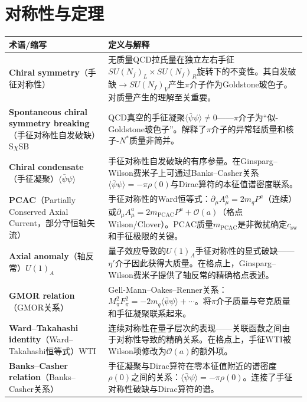 \documentclass[12pt,a4paper]{ctexart}
\begin{document}
\section{对称性与定理}

\begin{longtable}{p{3.5cm}p{9cm}}
\toprule
\textbf{术语/缩写} & \textbf{定义与解释} \\
\midrule
\endhead
\textbf{Chiral symmetry}（手征对称性）& 无质量QCD拉氏量在独立左右手征$SU(N_f)_L \times SU(N_f)_R$旋转下的不变性。其自发破缺$\to SU(N_f)_V$产生$\pi$介子作为Goldstone玻色子。对质量产生的理解至关重要。\\
\textbf{Spontaneous chiral symmetry breaking}（手征对称性自发破缺）S$\chi$SB& QCD真空的手征凝聚$\langle \bar\psi\psi \rangle \neq 0$——$\pi$介子为``似-Goldstone玻色子''。解释了$\pi$介子的异常轻质量和核子-$N^*$质量非简并。\\
\textbf{Chiral condensate}（手征凝聚）$\langle \bar\psi\psi \rangle$& 手征对称性自发破缺的有序参量。在Ginsparg--Wilson费米子上可通过Banks--Casher关系$\langle \bar\psi\psi \rangle = -\pi\rho(0)$与Dirac算符的本征值谱密度联系。\\
\textbf{PCAC}（Partially Conserved Axial Current，部分守恒轴矢流）& 手征对称性的Ward恒等式：$\partial_\mu A_\mu^a = 2m_q P^a$（连续）或$\partial_\mu A_\mu^a = 2m_{\text{PCAC}} P^a + \mathcal{O}(a)$（格点Wilson/Clover）。PCAC质量$m_{\text{PCAC}}$是非微扰确定$c_{\text{sw}}$和手征极限的关键。\\
\textbf{Axial anomaly}（轴反常）$U(1)_A$& 量子效应导致的$U(1)_A$手征对称性的显式破缺——$\eta'$介子因此获得大质量。在格点上，Ginsparg--Wilson费米子提供了轴反常的精确格点表述。\\
\textbf{GMOR relation}（GMOR关系）& Gell-Mann--Oakes--Renner关系：$M_\pi^2 F_\pi^2 = -2m_q \langle \bar\psi\psi \rangle + \cdots$。将$\pi$介子质量与夸克质量和手征凝聚联系起来。\\
\textbf{Ward--Takahashi identity}（Ward--Takahashi恒等式）WTI& 连续对称性在量子层次的表现——关联函数之间由于对称性导致的精确关系。在格点上，手征WTI被Wilson项修改为$\mathcal{O}(a)$的额外项。\\
\textbf{Banks--Casher relation}（Banks--Casher关系）& 手征凝聚与Dirac算符在零本征值附近的谱密度$\rho(0)$之间的关系：$\langle \bar\psi\psi \rangle = -\pi\rho(0)$。连接了手征对称性破缺与Dirac算符的谱。\\
\bottomrule
\end{longtable}
\end{document}
